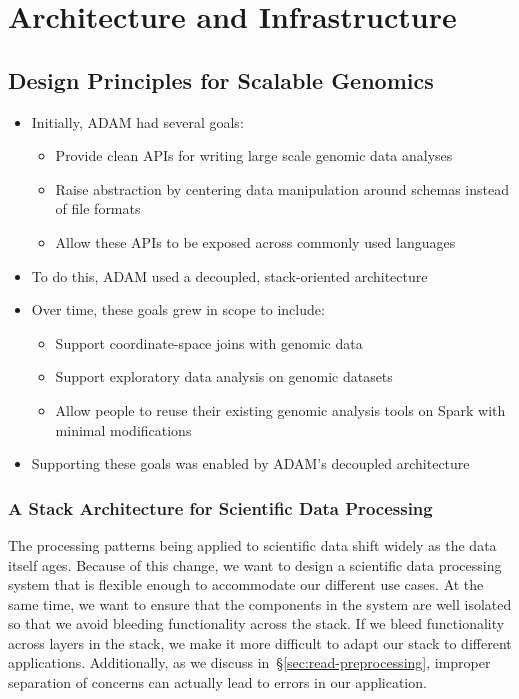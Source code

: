 \documentclass[phd]{ucbthesis}
\begin{document}
\part{Architecture and Infrastructure}

\chapter{Design Principles for Scalable Genomics}
\label{chap:design}

\begin{itemize}
\item Initially, \textsc{ADAM} had several goals:
  \begin{itemize}
  \item Provide clean APIs for writing large scale genomic data analyses
  \item Raise abstraction by centering data manipulation around schemas instead
    of file formats
  \item Allow these APIs to be exposed across commonly used languages
  \end{itemize}
\item To do this, \textsc{ADAM} used a decoupled, stack-oriented architecture
\item Over time, these goals grew in scope to include:
  \begin{itemize}
  \item Support coordinate-space joins with genomic data
  \item Support exploratory data analysis on genomic datasets
  \item Allow people to reuse their existing genomic analysis tools on Spark with
    minimal modifications
  \end{itemize}
\item Supporting these goals was enabled by \textsc{ADAM}'s decoupled architecture
\end{itemize}

\section{A Stack Architecture for Scientific Data Processing}
\label{sec:stack-architecture}

The processing patterns being applied to scientific data shift widely as the data itself ages. Because of
this change, we want to design a scientific data processing system that is flexible enough to
accommodate our different use cases. At the same time, we want to ensure that the components in the
system are well isolated so that we avoid bleeding functionality across the stack. If we bleed functionality
across layers in the stack, we make it more difficult to adapt our stack to different applications.
Additionally, as we discuss in~\S\ref{sec:read-preprocessing}, improper separation of concerns can
actually lead to errors in our application.
\end{document}
